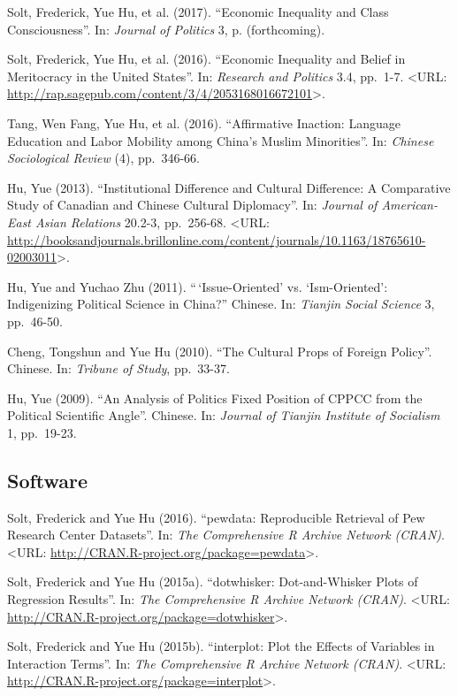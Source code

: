 \documentclass[10.5pt,]{article}
\begin{document}
Solt, Frederick, Yue Hu, et al. (2017). ``Economic Inequality and Class
Consciousness''. In: \emph{Journal of Politics} 3, p. (forthcoming).

Solt, Frederick, Yue Hu, et al. (2016). ``Economic Inequality and Belief
in Meritocracy in the United States''. In: \emph{Research and Politics}
3.4, pp.~1-7. \textless{}URL:
\url{http://rap.sagepub.com/content/3/4/2053168016672101}\textgreater{}.

Tang, Wen Fang, Yue Hu, et al. (2016). ``Affirmative Inaction: Language
Education and Labor Mobility among China's Muslim Minorities''. In:
\emph{Chinese Sociological Review} (4), pp.~346-66.

Hu, Yue (2013). ``Institutional Difference and Cultural Difference: A
Comparative Study of Canadian and Chinese Cultural Diplomacy''. In:
\emph{Journal of American-East Asian Relations} 20.2-3, pp.~256-68.
\textless{}URL:
\url{http://booksandjournals.brillonline.com/content/journals/10.1163/18765610-02003011}\textgreater{}.

Hu, Yue and Yuchao Zhu (2011). ``\,`Issue-Oriented' vs. `Ism-Oriented':
Indigenizing Political Science in China?'' Chinese. In: \emph{Tianjin
Social Science} 3, pp.~46-50.

Cheng, Tongshun and Yue Hu (2010). ``The Cultural Props of Foreign
Policy''. Chinese. In: \emph{Tribune of Study}, pp.~33-37.

Hu, Yue (2009). ``An Analysis of Politics Fixed Position of CPPCC from
the Political Scientific Angle''. Chinese. In: \emph{Journal of Tianjin
Institute of Socialism} 1, pp.~19-23.

\subsection{Software}\label{software}

Solt, Frederick and Yue Hu (2016). ``pewdata: Reproducible Retrieval of
Pew Research Center Datasets''. In: \emph{The Comprehensive R Archive
Network (CRAN)}. \textless{}URL:
\url{http://CRAN.R-project.org/package=pewdata}\textgreater{}.

Solt, Frederick and Yue Hu (2015a). ``dotwhisker: Dot-and-Whisker Plots
of Regression Results''. In: \emph{The Comprehensive R Archive Network
(CRAN)}. \textless{}URL:
\url{http://CRAN.R-project.org/package=dotwhisker}\textgreater{}.

Solt, Frederick and Yue Hu (2015b). ``interplot: Plot the Effects of
Variables in Interaction Terms''. In: \emph{The Comprehensive R Archive
Network (CRAN)}. \textless{}URL:
\url{http://CRAN.R-project.org/package=interplot}\textgreater{}.
\end{document}

